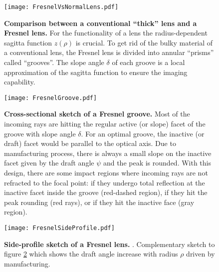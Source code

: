 \begin{figure}[H]
	\centering
	\texttt{[image: FresnelVsNormalLens.pdf]}
	\caption[Comparison conventional vs. Fresnel lens]{\textbf{Comparison between a conventional \enquote{thick} lens and a Fresnel lens.} \cite{famous:eichler} For the functionality of a lens the radius-dependent sagitta function $z(\rho)$ is crucial. To get rid of the bulky material of a conventional lens, the Fresnel lens is divided into annular \enquote{prisms} called \enquote{grooves}. The slope angle $\delta$ of each groove is a local approximation of the sagitta function to ensure the imaging capability.}
	\label{iceact:model:fresnelvsthick}	
\end{figure}

\begin{figure}[H]
	\centering
	\texttt{[image: FresnelGroove.pdf]}
	\caption[Fresnel groove]{\textbf{Cross-sectional sketch of a Fresnel groove.} \cite{famous:eichler} Most of the incoming rays are hitting the regular active (or slope) facet of the groove with slope angle $\delta$. For an optimal groove, the inactive (or draft) facet would be parallel to the optical axis. Due to manufacturing process, there is always a small slope on the inactive facet given by the draft angle $\psi$ and the peak is rounded. With this design, there are some impact regions where incoming rays are not refracted to the focal point: if they undergo total reflection at the inactive facet inside the groove (red-dashed region), if they hit the peak rounding (red rays), or if they hit the inactive face (gray region).}
	\label{iceact:model:fresnelgroove}	
\end{figure}

\begin{figure}[H]
	\centering
	\texttt{[image: FresnelSideProfile.pdf]}
	\caption[Fresnel side-profile]{\textbf{Side-profile sketch of a Fresnel lens.} \cite[adapted]{iceact:fresnellens:design}. Complementary sketch to figure \ref{iceact:model:fresnelgroove} which shows the draft angle increase with radius $\rho$ driven by manufacturing.}
	\label{iceact:model:fresnelprofile}	
\end{figure}

